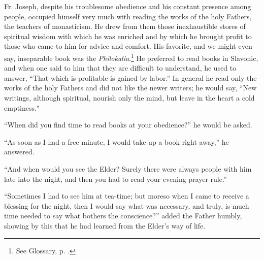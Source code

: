 Fr. Joseph, despite his troublesome obedience and his constant presence among people, occupied himself very much with reading the works of the holy Fathers, the teachers of monasticism. He drew from them those inexhaustible stores of spiritual wisdom with which he was enriched and by which he brought profit to those who came to him for advice and comfort. His favorite, and we might even say, inseparable book was the \textit{Philokalia}.\footnote{See Glossary, p. \pageref{Philokalia}.} He preferred to read books in Slavonic, and when one said to him that they are difficult to understand, he used to answer, “That which is profitable is gained by labor.” In general he read only the works of the holy Fathers and did not like the newer writers; he would say, “New writings, although spiritual, nourish only the mind, but leave in the heart a cold emptiness."

“When did you find time to read books at your obedience?'' he would be asked.

“As soon as I had a free minute, I would take up a book right away,” he answered.

“And when would you see the Elder? Surely there were always people with him late into the night, and then you had to read your evening prayer rule.”

“Sometimes I had to see him at tea-time; but moreso when I came to receive a blessing for the night, then I would say what was necessary, and truly, is much time needed to say what bothers the conscience?” added the Father humbly, showing by this that he had learned from the Elder's way of life.


